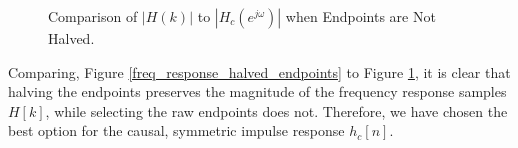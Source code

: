 \documentclass[fleqn]{article}
\begin{document}
	\begin{figure}[H]
		\centerline{}
		\caption{\doublespacing Comparison of $|H(k)|$ to $|H_c(e^{j\omega})|$ when Endpoints are Not Halved.}
		\label{freq_response_raw_endpoints}
	\end{figure}
			
	Comparing, Figure \ref{freq_response_halved_endpoints} to Figure \ref{freq_response_raw_endpoints}, it is clear that halving the endpoints preserves the magnitude of the frequency response samples $H[k]$, while selecting the raw endpoints does not. Therefore, we have chosen the best option for the causal, symmetric impulse response $h_c[n]$.
\end{document}
